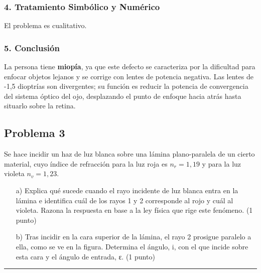 \subsubsection*{4. Tratamiento Simbólico y Numérico}
El problema es cualitativo.

\subsubsection*{5. Conclusión}
\begin{cajaconclusion}
La persona tiene \textbf{miopía}, ya que este defecto se caracteriza por la dificultad para enfocar objetos lejanos y se corrige con lentes de potencia negativa. Las lentes de -1,5 dioptrías son divergentes; su función es reducir la potencia de convergencia del sistema óptico del ojo, desplazando el punto de enfoque hacia atrás hasta situarlo sobre la retina.
\end{cajaconclusion}
\newpage
\subsection{Problema 3}
\label{subsec:P3_2020_jul_ext_b}

\begin{cajaenunciado}
Se hace incidir un haz de luz blanca sobre una lámina plano-paralela de un cierto material, cuyo índice de refracción para la luz roja es $n_r=1,19$ y para la luz violeta $n_v=1,23$.
\begin{enumerate}
    \item[a)] Explica qué sucede cuando el rayo incidente de luz blanca entra en la lámina e identifica cuál de los rayos 1 y 2 corresponde al rojo y cuál al violeta. Razona la respuesta en base a la ley física que rige este fenómeno. (1 punto)
    \item[b)] Tras incidir en la cara superior de la lámina, el rayo 2 prosigue paralelo a ella, como se ve en la figura. Determina el ángulo, i, con el que incide sobre esta cara y el ángulo de entrada, ε. (1 punto)
\end{enumerate}
\end{cajaenunciado}
\hrule

